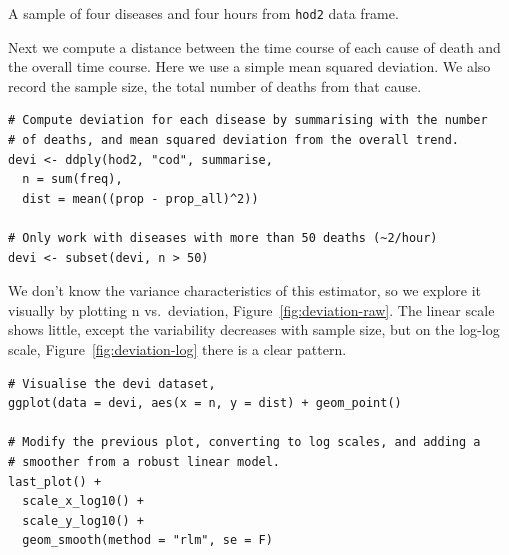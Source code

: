 \documentclass[article]{jss}
\begin{document}
\begin{table}[htbp]
  \centering
  \subfloat[]{
    \label{tbl:counts:1}
  }%
  \subfloat[]{
    \label{tbl:counts:2}
  }%
  \subfloat[]{
    \label{tbl:counts:3}
  }%
  \subfloat[]{
    \label{tbl:counts:4}
  }
  
  \caption{A sample of four diseases and four hours from {\tt hod2} data frame.}
  \label{tbl:counts}
\end{table}

Next we compute a distance between the time course of each cause of death and the overall time course. Here we use a simple mean squared deviation.  We also record the sample size, the total number of deaths from that cause.

\begin{verbatim}
# Compute deviation for each disease by summarising with the number
# of deaths, and mean squared deviation from the overall trend.
devi <- ddply(hod2, "cod", summarise, 
  n = sum(freq), 
  dist = mean((prop - prop_all)^2))

# Only work with diseases with more than 50 deaths (~2/hour)
devi <- subset(devi, n > 50)
\end{verbatim}

We don't know the variance characteristics of this estimator, so we explore it visually by plotting n vs.\ deviation, Figure~\ref{fig:deviation-raw}. The linear scale shows little, except the variability decreases with sample size, but on the log-log scale, Figure~\ref{fig:deviation-log} there is a clear pattern. 

\begin{verbatim}
# Visualise the devi dataset,
ggplot(data = devi, aes(x = n, y = dist) + geom_point()

# Modify the previous plot, converting to log scales, and adding a
# smoother from a robust linear model.
last_plot() + 
  scale_x_log10() + 
  scale_y_log10() +
  geom_smooth(method = "rlm", se = F)
\end{verbatim}
\end{document}
